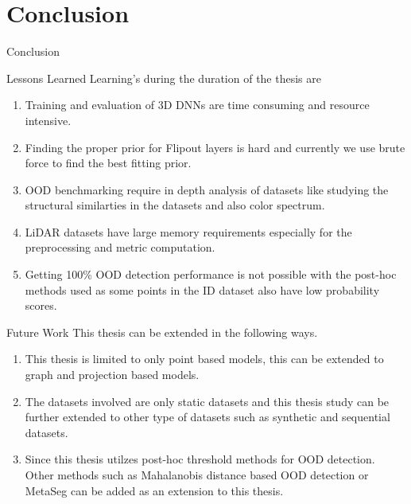 \documentclass[aspectratio=169]{beamer}
\begin{document}
\section{Conclusion}
\begin{frame}{Conclusion}
    
\end{frame}
\begin{frame}{Lessons Learned}
    Learning's during the duration of the thesis are
    \begin{enumerate}
        \item Training and evaluation of 3D DNNs are time consuming and resource intensive.
        \item Finding the proper prior for Flipout layers is hard and currently we use brute force to find the best fitting prior.
        \item OOD benchmarking require in depth analysis of datasets like studying the structural similarties in the datasets and also color spectrum.
        \item LiDAR datasets have large memory requirements especially for the preprocessing and metric computation.
        \item Getting 100\% OOD detection performance is not possible with the post-hoc methods used as some points in the ID dataset also have low probability scores.
    \end{enumerate}
\end{frame}
\begin{frame}{Future Work}
    This thesis can be extended in the following ways.
    \begin{enumerate}
        \item This thesis is limited to only point based models, this can be extended to graph and projection based models.
        \item The datasets involved are only static datasets and this thesis study can be further extended to other type of datasets such as synthetic and sequential datasets.
        \item Since this thesis utilzes post-hoc threshold methods for OOD detection. Other methods such as Mahalanobis distance based OOD detection \cite{lee2018simple_mahalanobis} or MetaSeg \cite{MetaSeg} can be added as an extension to this thesis.
    \end{enumerate}
\end{frame}
\end{document}

